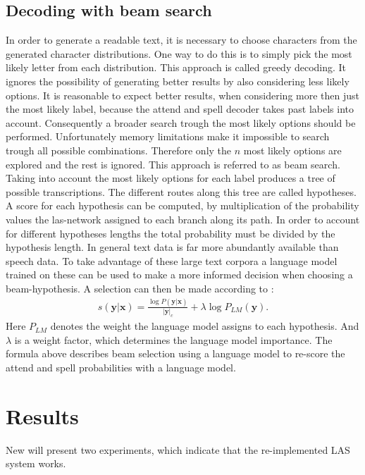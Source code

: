 \documentclass{article}
\begin{document}
\subsection{Decoding with beam search}
\label{sec:beamsearch}
In order to generate a readable text, it is necessary to choose characters from the generated character distributions. One way to do this is to simply pick the most likely letter from each distribution. This approach is called greedy decoding. It ignores the possibility of generating better results by also considering less likely options. It is reasonable to expect better results, when considering more then just the most likely label, because the attend and spell decoder takes past labels into account. Consequently a broader search trough the most likely options should be performed. Unfortunately memory limitations make it impossible to search trough all possible combinations. Therefore only the $n$ most likely options are explored and the rest is ignored. This approach is referred to as beam search. Taking into account the most likely options for each label produces a tree of possible transcriptions. The different routes along this tree are called hypotheses. A score for each hypothesis can be computed, by multiplication of the probability values the las-network assigned to each branch along its path. In order to account for different hypotheses lengths the total probability must be divided by the hypothesis length. In general text data is far more abundantly available than speech data. To take advantage of these large text corpora a language model trained on these can be used to make a more informed decision when choosing a beam-hypothesis. A selection can then be made according to \cite[page 6]{Chan2015}:
\begin{align}
s(\mathbf{y}|\mathbf{x}) = \frac{\log P(\mathbf{y}|\mathbf{x})}{ |\mathbf{y}|_c} + \lambda \log P_{LM}(\mathbf{y}).
\end{align}
Here $P_{LM}$ denotes the weight the language model assigns to each hypothesis. And $\lambda$ is a weight factor, which determines the language model importance. The formula above describes beam selection using a language model to re-score the attend and spell probabilities with a language model.

\section{Results}
New will present two experiments, which indicate that the re-implemented LAS system works.
\label{sec:results}
\end{document}
